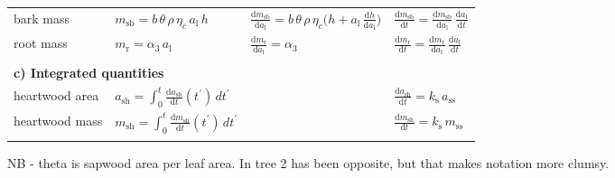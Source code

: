 \documentclass[12pt, a4paper]{article}
\begin{document}
\begin{table}[ht]
{\begin{doublespace}
\begin{tabular}{p{2.5cm}p{3.5cm}p{5cm}p{4cm} }
  bark mass &
    $m_\textrm{sb} = b\, \theta \, \rho \, \eta_c \, a_\textrm{l} \, h $ &
    $\frac{\textrm{d}m_\textrm{sb}}{\textrm{d}a_\textrm{l}} = b \, \theta \, \rho \, \eta_c\big( h + a_\textrm{l} \, \frac{\textrm{d}h}{\textrm{d}a_\textrm{l}} \big)$ &
    $\frac{\textrm{d}m_\textrm{sb}}{\textrm{d}t}  = \frac{\textrm{d}m_\textrm{sb}}{\textrm{d}a_\textrm{l}} \, \frac{\textrm{d}a_\textrm{l}}{\textrm{d}t}$ \\
  root mass &
    $m_\textrm{r} = \alpha_3 \, a_\textrm{l}$ &
    $\frac{\textrm{d}m_\textrm{r}}{\textrm{d}a_\textrm{l}} = \alpha_3$  &
    $\frac{\textrm{d}m_\textrm{r}}{\textrm{d}t}  = \frac{\textrm{d}m_\textrm{r}}{\textrm{d}a_\textrm{l}}  \, \frac{\textrm{d}a_\textrm{l}}{\textrm{d}t}$ \\ \\

  \multicolumn{4}{l}{\textbf{c) Integrated quantities}} \\
  heartwood area &
    $a_\textrm{sh} = \int_0^t \frac{\textrm{d}a_\textrm{sh}}{\textrm{d}t}(t^\prime) \, dt^\prime$ &
     &
    $\frac{\textrm{d}a_\textrm{sh}}{\textrm{d}t} = k_\textrm{s} \, a_\textrm{ss}$ \\
  heartwood mass &
    $m_\textrm{sh} = \int_0^t \frac{\textrm{d}m_\textrm{sh}}{\textrm{d}t}(t^\prime) \, dt^\prime$ &
     &
    $\frac{\textrm{d}m_\textrm{sh}}{\textrm{d}t} = k_\textrm{s} \, m_\textrm{ss}$ \\
  \hline \\
\end{tabular}
NB -  theta is sapwood area per leaf area. In tree 2 has been opposite, but that makes notation more clumsy.
\end{doublespace}}
\label{tab:allometry}
\end{table}

\newpage
\end{document}
